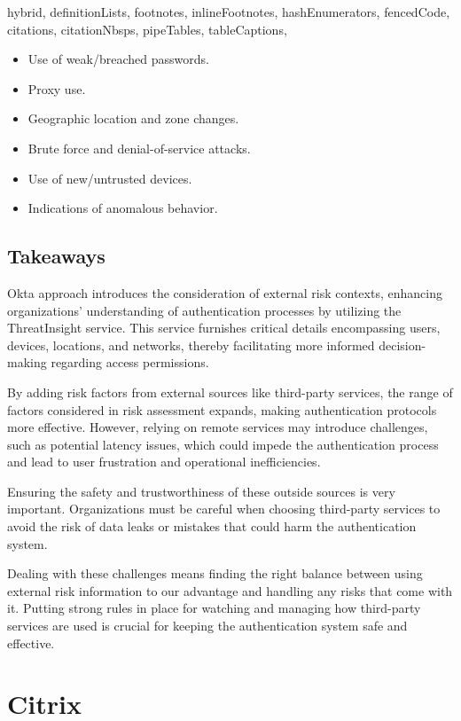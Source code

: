 \documentclass[
  digital,     %
  oneside,     %
  nosansbold,  %
  nocolorbold, %
  lof,         %
  lot,         %
]{fithesis4}
\begin{document}
\begin{markdown*}{%
  hybrid,
  definitionLists,
  footnotes,
  inlineFootnotes,
  hashEnumerators,
  fencedCode,
  citations,
  citationNbsps,
  pipeTables,
  tableCaptions,
}

\begin{itemize}
    \item Use of weak/breached passwords.
    \item Proxy use.
    \item Geographic location and zone changes.
    \item Brute force and denial-of-service attacks.
    \item Use of new/untrusted devices.
    \item Indications of anomalous behavior. 
\end{itemize}

\newpage
\subsection{Takeaways}
Okta approach introduces the consideration of external risk contexts, enhancing organizations' understanding of authentication processes by utilizing the ThreatInsight service.
This service furnishes critical details encompassing users, devices, locations, and networks, thereby facilitating more informed decision-making regarding access permissions.

By adding risk factors from external sources like third-party services, the range of factors considered in risk assessment expands, making authentication protocols more effective.
However, relying on remote services may introduce challenges, such as potential latency issues, which could impede the authentication process and lead to user frustration and operational inefficiencies.

Ensuring the safety and trustworthiness of these outside sources is very important.
Organizations must be careful when choosing third-party services to avoid the risk of data leaks or mistakes that could harm the authentication system.

Dealing with these challenges means finding the right balance between using external risk information to our advantage and handling any risks that come with it.
Putting strong rules in place for watching and managing how third-party services are used is crucial for keeping the authentication system safe and effective. \cite{existing-okta-lowrisk} \cite{existing-okta-confidence}

\newpage
\section{Citrix}


\end{markdown*}
\end{document}
